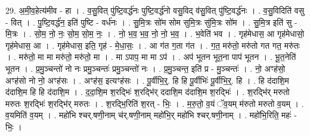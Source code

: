 \documentclass[17pt]{extarticle}
\begin{document}
29. अ॒मी॒व॒हेत्य॑मीव - हा । . व॒सु॒वित् पु॑ष्टि॒वर्द्ध॑नः पुष्टि॒वर्द्ध॑नो वसु॒विद् व॑सु॒वित् पु॑ष्टि॒वर्द्ध॑नः । . व॒सु॒विदिति॑ वसु - वित् । . पु॒ष्टि॒वर्द्ध॑न॒ इति॑ पुष्टि - वर्ध॑नः । . सु॒मि॒त्रः सो॑म सोम सुमि॒त्रः सु॑मि॒त्रः सो॑म । . सु॒मि॒त्र इति॑ सु - मि॒त्रः । . सो॒म॒ नो॒ नः॒ सो॒म॒ सो॒म॒ नः॒ । . नो॒ भ॒व॒ भ॒व॒ नो॒ नो॒ भ॒व॒ । . भ॒वेति॑ भव । . गृह॑मेधास॒ आ गृह॑मेधासो॒ गृह॑मेधास॒ आ । . गृह॑मेधास॒ इति॒ गृह॑ - मे॒धा॒सः॒ । . आ ग॑त ग॒ता ग॑त । . ग॒त॒ मरु॑तो॒ मरु॑तो गत गत॒ मरु॑तः । . मरु॑तो॒ मा मा मरु॑तो॒ मरु॑तो॒ मा । . मा ऽपाप॒ मा मा ऽप॑ । . अप॑ भूतन भूत॒ना पाप॑ भूतन । . भू॒त॒नेति॑ भूतन । . प्र॒मु॒ञ्चन्तो॑ नो नः प्रमु॒ञ्चन्तः॑ प्रमु॒ञ्चन्तो॑ नः । . प्र॒मु॒ञ्चन्त॒ इति॑ प्र - मु॒ञ्चन्तः॑ । . नो॒ अꣳह॑सो॒ अꣳह॑सो नो नो॒ अꣳह॑सः । . अꣳह॑स॒ इत्यꣳह॑सः । . पू॒र्वीभि॒र्॒. हि हि पू॒र्वीभिः॑ पू॒र्वीभि॒र्॒. हि । . हि द॑दाशि॒म द॑दाशि॒म हि हि द॑दाशि॒म । . द॒दा॒शि॒म श॒रद्भिः॑ श॒रद्भि॑र् ददाशि॒म द॑दाशि॒म श॒रद्भिः॑ । . श॒रद्भि॑र् मरुतो मरुतः श॒रद्भिः॑ श॒रद्भि॑र् मरुतः । . श॒रद्भि॒रिति॑ श॒रत् - भिः॒ । . म॒रु॒तो॒ व॒यं ॅव॒यम् म॑रुतो मरुतो व॒यम् । . व॒यमिति॑ व॒यम् । . महो॑भि श्चर्.षणी॒नाम् च॑र्.षणी॒नाम् महो॑भि॒र् महो॑भि श्चर्.षणी॒नाम् । . महो॑भि॒रिति॒ महः॑ - भिः॒ । \newline
\end{document}

